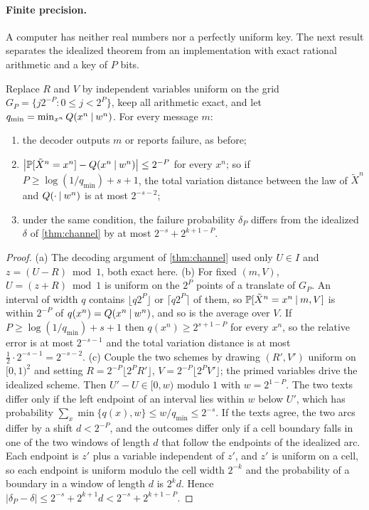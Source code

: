 \paragraph{Finite precision.} A computer has neither real numbers nor a perfectly uniform key. The next result separates the idealized theorem from an implementation with exact rational arithmetic and a key of $P$ bits.
\begin{proposition}\label{prop:finite}
Replace $R$ and $V$ by independent variables uniform on the grid $G_P=\{j2^{-P}:0\le j<2^P\}$, keep all arithmetic exact, and let $q_{\min}=\min_{x^n}Q(x^n\mathbin{\vert} w^n)$. For every message $m$:
\begin{enumerate}[label=\textup{(\alph*)}]
\item the decoder outputs $m$ or reports failure, as before;
\item $\bigl|\mathbb{P}[\tilde X^n=x^n]-Q(x^n\mathbin{\vert} w^n)\bigr|\le2^{-P}$ for every $x^n$; so if $P\ge\log(1/q_{\min})+s+1$, the total variation distance between the law of $\tilde X^n$ and $Q(\cdot\mathbin{\vert} w^n)$ is at most $2^{-s-2}$;
\item under the same condition, the failure probability $\delta_P$ differs from the idealized $\delta$ of \cref{thm:channel} by at most $2^{-s}+2^{k+1-P}$.
\end{enumerate}
\end{proposition}
\begin{proof}
(a) The decoding argument of \cref{thm:channel} used only $U\in I$ and $z=(U-R)\bmod1$, both exact here.
(b) For fixed $(m,V)$, $U=(z+R)\bmod1$ is uniform on the $2^P$ points of a translate of $G_P$. An interval of width $q$ contains $\lfloor q2^P\rfloor$ or $\lceil q2^P\rceil$ of them, so $\mathbb{P}[\tilde X^n=x^n\mathbin{\vert} m,V]$ is within $2^{-P}$ of $q(x^n)=Q(x^n\mathbin{\vert} w^n)$, and so is the average over $V$. If $P\ge\log(1/q_{\min})+s+1$ then $q(x^n)\ge2^{s+1-P}$ for every $x^n$, so the relative error is at most $2^{-s-1}$ and the total variation distance is at most $\tfrac12\cdot2^{-s-1}=2^{-s-2}$.
(c) Couple the two schemes by drawing $(R',V')$ uniform on $[0,1)^2$ and setting $R=2^{-P}\lfloor2^PR'\rfloor$, $V=2^{-P}\lfloor2^PV'\rfloor$; the primed variables drive the idealized scheme. Then $U'-U\in[0,w)$ modulo $1$ with $w=2^{1-P}$. The two texts differ only if the left endpoint of an interval lies within $w$ below $U'$, which has probability $\sum_x\min\{q(x),w\}\le w/q_{\min}\le2^{-s}$. If the texts agree, the two arcs differ by a shift $d<2^{-P}$, and the outcomes differ only if a cell boundary falls in one of the two windows of length $d$ that follow the endpoints of the idealized arc. Each endpoint is $z'$ plus a variable independent of $z'$, and $z'$ is uniform on a cell, so each endpoint is uniform modulo the cell width $2^{-k}$ and the probability of a boundary in a window of length $d$ is $2^kd$. Hence $|\delta_P-\delta|\le2^{-s}+2^{k+1}d<2^{-s}+2^{k+1-P}$.
\end{proof}
